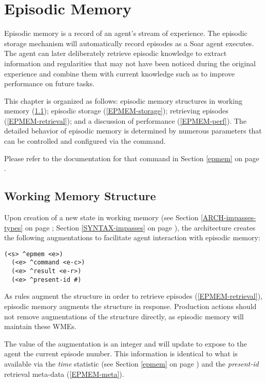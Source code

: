 \chapter{Episodic Memory}
\label{EPMEM}

Episodic memory is a record of an agent's stream of experience.
The episodic storage mechanism will automatically record episodes as a Soar agent executes.
The agent can later deliberately retrieve episodic knowledge to extract information and regularities that may not have been noticed during the original experience and combine them with current knowledge such as to improve performance on future tasks.

This chapter is organized as follows: episodic memory structures in working memory (\ref{EPMEM-wm}); episodic storage (\ref{EPMEM-storage}); retrieving episodes (\ref{EPMEM-retrieval}); and a discussion of performance (\ref{EPMEM-perf}).
The detailed behavior of episodic memory is determined by numerous parameters that can be controlled and configured via the  command.

Please refer to the documentation for that command in Section \ref{epmem} on page \pageref{epmem}.

\section{Working Memory Structure}
\label{EPMEM-wm}

Upon creation of a new state in working memory (see Section \ref{ARCH-impasses-types} on page \pageref{ARCH-impasses-types}; Section \ref{SYNTAX-impasses} on page \pageref{SYNTAX-impasses}), the architecture creates the following augmentations to facilitate agent interaction with episodic memory:

\begin{verbatim}
(<s> ^epmem <e>)
  (<e> ^command <e-c>)
  (<e> ^result <e-r>)
  (<e> ^present-id #)
\end{verbatim}

As rules augment the  structure in order to retrieve episodes (\ref{EPMEM-retrieval}), episodic memory augments the  structure in response.
Production actions should not remove augmentations of the  structure directly, as episodic memory will maintain these WMEs.

The value of the  augmentation is an integer and will update to expose to the agent the current episode number.
This information is identical to what is available via the \emph{time} statistic (see Section \ref{epmem} on page \pageref{epmem}) and the \emph{present-id} retrieval meta-data (\ref{EPMEM-meta}).

